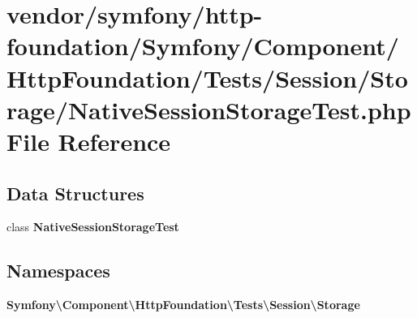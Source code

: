 \section{vendor/symfony/http-\/foundation/\+Symfony/\+Component/\+Http\+Foundation/\+Tests/\+Session/\+Storage/\+Native\+Session\+Storage\+Test.php File Reference}
\label{_native_session_storage_test_8php}
\subsection*{Data Structures}
\begin{DoxyCompactItemize}
\item 
class {\bf Native\+Session\+Storage\+Test}
\end{DoxyCompactItemize}
\subsection*{Namespaces}
\begin{DoxyCompactItemize}
\item 
 {\bf Symfony\textbackslash{}\+Component\textbackslash{}\+Http\+Foundation\textbackslash{}\+Tests\textbackslash{}\+Session\textbackslash{}\+Storage}
\end{DoxyCompactItemize}
